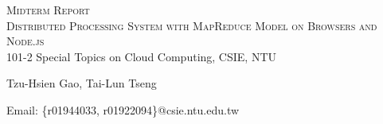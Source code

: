\documentclass[a4paper, 10pt]{report}
\begin{document}

\begin{center}
\begin{spacing}{2}
\textsc{\LARGE Midterm Report}\\[1.5cm]
\textsc{\LARGE Distributed Processing System with MapReduce Model on Browsers and Node.js}\\[2cm]
101-2 Special Topics on Cloud Computing, CSIE, NTU

Tzu-Hsien Gao, Tai-Lun Tseng

Email: \{r01944033, r01922094\}@csie.ntu.edu.tw
\end{spacing}
\end{center}








\end{document}
